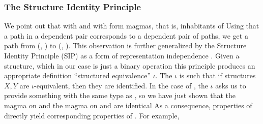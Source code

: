 \subsubsection{The Structure Identity Principle}
We point out that \bN{} with  and \bL{} with  form magmas, that is, inhabitants of
Using that a path in a dependent pair corresponds to a dependent pair of paths, we get a path from (\bN{}, ) to (\bL{}, ). %
This observation is further generalized by the Structure Identity Principle (SIP) as a form of representation independence \cite{iri}. Given a structure, which in our case is just a binary operation
this principle produces an appropriate definition ``structured equivalence'' $\iota$. The $\iota$ is such that if structures $X, Y$ are $\iota$-equivalent, then they are identified. In the case of , the $\iota$ asks us to provide something with the same type as , so we have just shown that the  magma on \bL{}
and the \AgdaFunction{\_+\_} magma on \bN{} and are identical
As a consequence, properties of \AgdaFunction{\_+\_} directly yield corresponding properties of . For example,
